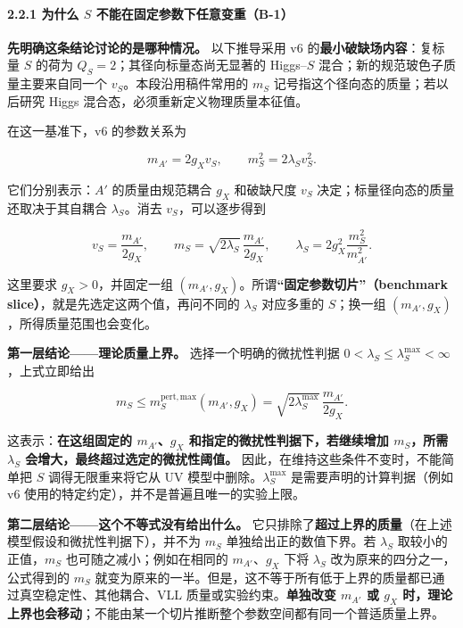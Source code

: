 \documentclass[
]{article}
\begin{document}
\paragraph{\texorpdfstring{2.2.1 为什么 \(S\)
不能在固定参数下任意变重（B-1）}{2.2.1 为什么 S 不能在固定参数下任意变重（B-1）}}\label{ux4e3aux4ec0ux4e48-s-ux4e0dux80fdux5728ux56faux5b9aux53c2ux6570ux4e0bux4efbux610fux53d8ux91cdb-1}

\textbf{先明确这条结论讨论的是哪种情况。} 以下推导采用 v6
的\textbf{最小破缺场内容}：复标量 \(S\) 的荷为
\(Q_S=2\)；其径向标量态尚无显著的 Higgs--\(S\)
混合；新的规范玻色子质量主要来自同一个 \(v_S\)。本段沿用稿件常用的
\(m_S\) 记号指这个径向态的质量；若以后研究 Higgs
混合态，必须重新定义物理质量本征值。

在这一基准下，v6 的参数关系为

\[
 m_{A'}=2g_Xv_S,\qquad m_S^2=2\lambda_Sv_S^2.
\]

它们分别表示：\(A'\) 的质量由规范耦合 \(g_X\) 和破缺尺度 \(v_S\)
决定；标量径向态的质量还取决于其自耦合 \(\lambda_S\)。消去
\(v_S\)，可以逐步得到

\[
 v_S=\frac{m_{A'}}{2g_X},\qquad
 m_S=\sqrt{2\lambda_S}\,\frac{m_{A'}}{2g_X},\qquad
 \lambda_S=2g_X^2\frac{m_S^2}{m_{A'}^2}.
\]

这里要求 \(g_X>0\)，并固定一组
\((m_{A'},g_X)\)。所谓\textbf{``固定参数切片''（benchmark
slice）}，就是先选定这两个值，再问不同的 \(\lambda_S\) 对应多重的
\(S\)；换一组 \((m_{A'},g_X)\)，所得质量范围也会变化。

\textbf{第一层结论------理论质量上界。} 选择一个明确的微扰性判据
\(0<\lambda_S\leq\lambda_S^{\max}<\infty\)，上式立即给出

\[
 \boxed{m_S\leq m_S^{\mathrm{pert,max}}(m_{A'},g_X)
 =\sqrt{2\lambda_S^{\max}}\,\frac{m_{A'}}{2g_X}}.
\]

这表示：\textbf{在这组固定的 \(m_{A'}\)、\(g_X\)
和指定的微扰性判据下，若继续增加 \(m_S\)，所需 \(\lambda_S\)
会增大，最终超过选定的微扰性阈值。}
因此，在维持这些条件不变时，不能简单把 \(S\) 调得无限重来将它从 UV
模型中删除。\(\lambda_S^{\max}\) 是需要声明的计算判据（例如 v6
使用的特定约定），并不是普遍且唯一的实验上限。

\textbf{第二层结论------这个不等式没有给出什么。}
它只排除了\textbf{超过上界的质量}（在上述模型假设和微扰性判据下），并不为
\(m_S\) 单独给出正的数值下界。若 \(\lambda_S\) 取较小的正值，\(m_S\)
也可随之减小；例如在相同的 \(m_{A'}\)、\(g_X\) 下将 \(\lambda_S\)
改为原来的四分之一，公式得到的 \(m_S\)
就变为原来的一半。但是，这不等于所有低于上界的质量都已通过真空稳定性、其他耦合、VLL
质量或实验约束。\textbf{单独改变 \(m_{A'}\) 或 \(g_X\)
时，理论上界也会移动}；不能由某一个切片推断整个参数空间都有同一个普适质量上界。
\end{document}
